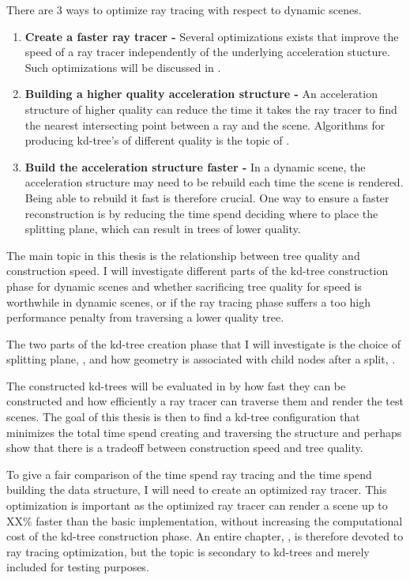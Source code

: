 There are 3 ways to optimize ray tracing with respect to dynamic
scenes. 

\begin{enumerate}
  \item \textbf{Create a faster ray tracer -} Several optimizations
    exists that improve the speed of a ray tracer independently of the
    underlying acceleration stucture. Such optimizations will be
    discussed in .
  \item \textbf{Building a higher quality acceleration structure -} An
    acceleration structure of higher quality can reduce the time it
    takes the ray tracer to find the nearest intersecting point
    between a ray and the scene. Algorithms for producing kd-tree's
    of different quality is the topic of
    .
  \item \textbf{Build the acceleration structure faster -} In a
    dynamic scene, the acceleration structure may need to be rebuild
    each time the scene is rendered. Being able to rebuild it fast is
    therefore crucial. One way to ensure a faster reconstruction is by
    reducing the time spend deciding where to place the splitting
    plane, which can result in trees of lower quality.
\end{enumerate}

The main topic in this thesis is the relationship between tree quality
and construction speed. I will investigate different parts of the
kd-tree construction phase for dynamic scenes and whether sacrificing
tree quality for speed is worthwhile in dynamic scenes, or if the ray
tracing phase suffers a too high performance penalty from traversing a
lower quality tree.

The two parts of the kd-tree creation phase that I will investigate is
the choice of splitting plane, , and
how geometry is associated with child nodes after a split,
.

The constructed kd-trees will be evaluated in 
by how fast they can be constructed and how efficiently a ray tracer
can traverse them and render the test scenes. The goal of this thesis
is then to find a kd-tree configuration that minimizes the total time
spend creating and traversing the structure and perhaps show that
there is a tradeoff between construction speed and tree quality.

To give a fair comparison of the time spend ray tracing and the time
spend building the data structure, I will need to create an optimized
ray tracer. This optimization is important as the optimized ray tracer
can render a scene up to XX\% faster than the basic implementation,
without increasing the computational cost of the kd-tree construction
phase. An entire chapter, , is therefore
devoted to ray tracing optimization, but the topic is secondary to
kd-trees and merely included for testing purposes.

